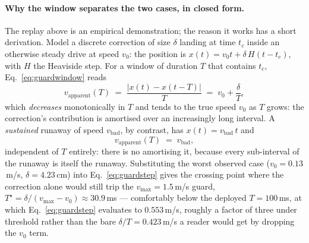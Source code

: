 \paragraph{Why the window separates the two cases, in closed form.} The
replay above is an empirical demonstration; the reason it works has a short
derivation. Model a discrete correction of size $\delta$ landing at time
$t_c$ inside an otherwise steady drive at speed $v_0$: the position is
$x(t) = v_0 t + \delta\,H(t-t_c)$, with $H$ the Heaviside step. For a window
of duration $T$ that contains $t_c$, Eq.~\ref{eq:guardwindow} reads
\begin{equation}
v_{\text{apparent}}(T) \;=\; \frac{\lvert x(t)-x(t-T)\rvert}{T}
\;=\; v_0 + \frac{\delta}{T} ,
\label{eq:guardstep}
\end{equation}
which \emph{decreases} monotonically in $T$ and tends to the true speed
$v_0$ as $T$ grows: the correction's contribution is amortised over an
increasingly long interval. A \emph{sustained} runaway of speed $v_{\text{bad}}$,
by contrast, has $x(t)=v_{\text{bad}}\,t$ and
\begin{equation}
v_{\text{apparent}}(T) \;=\; v_{\text{bad}} ,
\label{eq:guardramp}
\end{equation}
independent of $T$ entirely: there is no amortising it, because every
sub-interval of the runaway is itself the runaway. Substituting the worst
observed case ($v_0=0.13$\,m/s, $\delta=4.23$\,cm) into
Eq.~\ref{eq:guardstep} gives the crossing point where the correction alone
would still trip the $v_{\max}=1.5$\,m/s guard,
$T^\star = \delta/(v_{\max}-v_0) \approx 30.9$\,ms --- comfortably below the
deployed $T=100$\,ms, at which Eq.~\ref{eq:guardstep} evaluates to
$0.553$\,m/s, roughly a factor of three under threshold rather than the
bare $\delta/T=0.423$\,m/s a reader would get by dropping the $v_0$ term.
